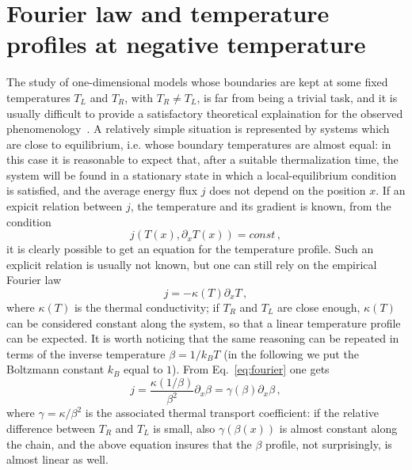\documentclass[iop, twocolumns, amssymb,notitlepage]{revtex4-1}
\begin{document}
\section{Fourier law and temperature profiles at negative temperature}
\label{sec:fouriernegative}

The study of one-dimensional models whose boundaries are kept at some fixed temperatures $T_L$ and $T_R$, with $T_R \ne T_L$, is far from being a trivial task, and it is usually difficult to provide a satisfactory theoretical explaination for the observed phenomenology~\cite{lepri03,dhar08,lepri16}. A relatively simple situation is represented by systems which are close to equilibrium, i.e. whose boundary temperatures are almost equal: in this case it is reasonable to expect that, after a suitable thermalization time, the system will be found in a stationary state in which a local-equilibrium condition is satisfied, and the average energy flux $j$ does not depend on the position $x$. If an expicit relation between $j$, the temperature and its gradient is known, from the condition
\begin{equation}
 j(T(x),\partial_x T(x)) = const\,,
\end{equation} 
it is clearly possible to get an equation for the temperature profile. Such an explicit relation is usually not known, but one can still rely on the empirical Fourier law
\begin{equation}
\label{eq:fourier}
 j= -\kappa(T) \partial_x T\,,
\end{equation} 
where $\kappa(T)$ is the thermal conductivity; if $T_R$ and $T_L$ are close enough, $\kappa(T)$ can be considered constant along the system, so that a linear temperature profile can be expected. It is worth noticing that the same reasoning can be repeated in terms of the inverse temperature $\beta=1/k_B T$ (in the following we put the Boltzmann constant $k_B$ equal to $1$). From Eq.~\eqref{eq:fourier} one gets
\begin{equation}
\label{eq:fourierbeta}
 j = \frac{\kappa(1/\beta)}{\beta^2} \partial_x \beta = \gamma(\beta) \partial_x \beta\,,
\end{equation} 
where $\gamma=\kappa/\beta^2$ is the associated thermal transport coefficient: if the relative difference between $T_R$ and $T_L$ is small, also $\gamma(\beta(x))$ is almost constant along the chain, and the above equation insures that the $\beta$ profile, not surprisingly, is almost linear as well.
\end{document}

